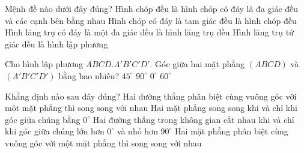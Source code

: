 \begin{ex}%
	Mệnh đề nào dưới đây đúng?
	\choice
	{\True Hình chóp đều là hình chóp có đáy là đa giác đều và các cạnh bên bằng nhau}
	{Hình chóp có đáy là tam giác đều là hình chóp đều}
	{Hình lăng trụ có đáy là một đa giác đều là hình lăng trụ đều}
	{Hình lăng trụ tứ giác đều là hình lập phương}
\end{ex}%
\begin{ex}%
	Cho hình lập phương $ABCD.A'B'C'D'$. Góc giữa hai mặt phẳng $(ABCD)$ và $(A'B'C'D')$ bằng bao nhiêu?
	\choice
	{$45^{\circ}$}
	{$90^{\circ}$}
	{\True $0^{\circ}$}
	{$60^{\circ}$}
\end{ex}%
\begin{ex}%
	Khẳng định nào sau đây đúng?	
	\choice
	{\True Hai đường thẳng phân biệt cùng vuông góc với một mặt phẳng thì song song với nhau}
	{Hai mặt phẳng song song khi và chỉ khi góc giữa chúng bằng $0^{\circ}$}
	{Hai đường thẳng trong không gian cắt nhau khi và chỉ khi góc giữa chúng lớn hơn $0^{\circ}$ và nhỏ hơn $90^{\circ}$ }
	{Hai mặt phẳng phân biệt cùng vuông góc với một mặt phẳng thì song song với nhau}
\end{ex}